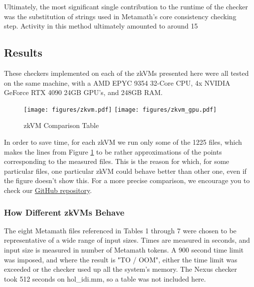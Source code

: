 \documentclass{article}
\theoremstyle{plain}
\theoremstyle{definition}
\begin{document}
Ultimately, the most significant single contribution to the runtime of the checker was the substitution of strings used in Metamath's core consistency checking step. Activity in this method ultimately amounted to around 15\

\subsection{Results}
These checkers implemented on each of the zkVMs presented here were all tested on the same machine, with a AMD EPYC 9354 32-Core CPU, 4x NVIDIA GeForce RTX 4090 24GB GPU's, and 248GB RAM.



\begin{figure}
\texttt{[image: figures/zkvm.pdf]}
\texttt{[image: figures/zkvm\_gpu.pdf]}
\caption{zkVM Comparison Table}
\label{zkVM comparison}
\end{figure}

In order to save time, for each zkVM we run only some of the 1225 files, which makes the lines from Figure \ref{zkVM comparison} to be rather approximations of the points corresponding to the measured files. This is the reason for which, for some particular files, one particular zkVM could behave better than other one, even if the figure doesn't show this. For a more precise comparison, we encourage you to check our \href{https://github.com/Pi-Squared-Inc/zk-benchmark}{GitHub repository}.

\subsubsection{How Different zkVMs Behave}

The eight Metamath files referenced in Tables 1 through 7 were chosen to be representative of a wide range of input sizes. Times are measured in seconds, and input size is measured in number of Metamath tokens. A 900 second time limit was imposed, and where the result is "TO / OOM", either the time limit was exceeded or the checker used up all the system's memory. The Nexus checker took 512 seconds on hol\_idi.mm, so a table was not included here.
\end{document}
